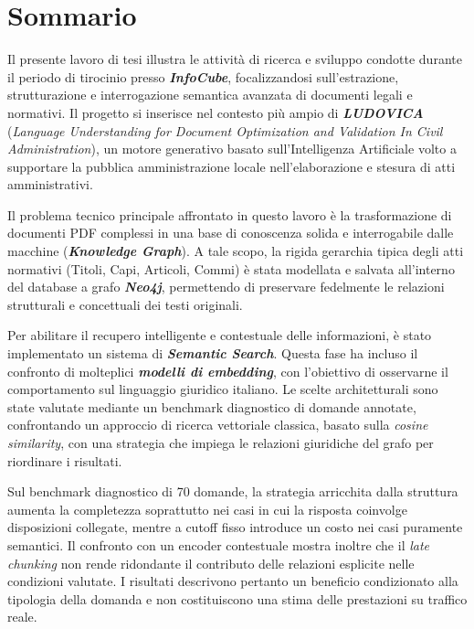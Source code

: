 \chapter*{Sommario}
Il presente lavoro di tesi illustra le attività di ricerca e sviluppo condotte durante il periodo di tirocinio presso \textbf{\textit{InfoCube}}, focalizzandosi sull'estrazione, strutturazione e interrogazione semantica avanzata di documenti legali e normativi. Il progetto si inserisce nel contesto più ampio di \textbf{\textit{LUDOVICA}} (\textit{Language Understanding for Document Optimization and Validation In Civil Administration}), un motore generativo basato sull'Intelligenza Artificiale volto a supportare la pubblica amministrazione locale nell'elaborazione e stesura di atti amministrativi.

Il problema tecnico principale affrontato in questo lavoro è la trasformazione di documenti PDF complessi in una base di conoscenza solida e interrogabile dalle macchine (\textbf{\textit{Knowledge Graph}}). A tale scopo, la rigida gerarchia tipica degli atti normativi (Titoli, Capi, Articoli, Commi) è stata modellata e salvata all'interno del database a grafo \textbf{\textit{Neo4j}}\cite{neo4j}, permettendo di preservare fedelmente le relazioni strutturali e concettuali dei testi originali.

Per abilitare il recupero intelligente e contestuale delle informazioni, è stato implementato un sistema di \textbf{\textit{Semantic Search}}. Questa fase ha incluso il confronto di molteplici \textbf{\textit{modelli di embedding}}, con l'obiettivo di osservarne il comportamento sul linguaggio giuridico italiano. Le scelte architetturali sono state valutate mediante un benchmark diagnostico di domande annotate, confrontando un approccio di ricerca vettoriale classica, basato sulla \textit{cosine similarity}, con una strategia che impiega le relazioni giuridiche del grafo per riordinare i risultati.

Sul benchmark diagnostico di 70 domande, la strategia arricchita dalla struttura aumenta la completezza soprattutto nei casi in cui la risposta coinvolge disposizioni collegate, mentre a cutoff fisso introduce un costo nei casi puramente semantici. Il confronto con un encoder contestuale mostra inoltre che il \textit{late chunking} non rende ridondante il contributo delle relazioni esplicite nelle condizioni valutate. I risultati descrivono pertanto un beneficio condizionato alla tipologia della domanda e non costituiscono una stima delle prestazioni su traffico reale.
